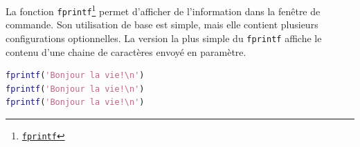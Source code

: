 \documentclass[]{tufte-handout}
\newcommand{\passthrough}[1]{#1}
\begin{document}
La fonction \passthrough{\lstinline!fprintf!}\footnote{\href{https://www.mathworks.com/help/matlab/ref/fprintf.html}{\passthrough{\lstinline!fprintf!}}}
permet d'afficher de l'information dans la fenêtre de commande. Son
utilisation de base est simple, mais elle contient plusieurs
configurations optionnelles. La version la plus simple du
\passthrough{\lstinline!fprintf!} affiche le contenu d'une chaine de
caractères envoyé en paramètre.

\begin{lstlisting}[language=Matlab]
fprintf('Bonjour la vie!\n')
fprintf('Bonjour la vie!\n')
fprintf('Bonjour la vie!\n')
\end{lstlisting}
\end{document}
